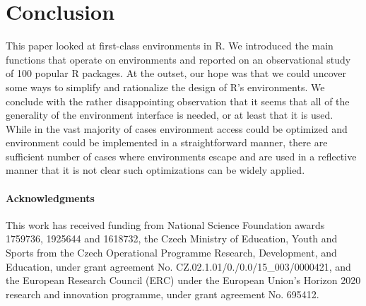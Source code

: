 \documentclass[10pt,sigplan,authorversion=true]{acmart}
\renewcommand{\c}[1]{\lstinline |#1|\xspace}
\begin{document}


\section{Conclusion}

This paper looked at first-class environments in R. We introduced the main
functions that operate on environments and reported on an observational study of
100 popular R packages. At the outset, our hope was that we could uncover some
ways to simplify and rationalize the design of R's environments. We conclude
with the rather disappointing observation that it seems that all of the
generality of the environment interface is needed, or at least that it is used.
While in the vast majority of cases environment access could be optimized and
environment could be implemented in a straightforward manner, there are
sufficient number of cases where environments escape and are used in a
reflective manner that it is not clear such optimizations can be widely applied.

\paragraph{Acknowledgments}
This work has received funding from National Science Foundation awards 1759736,
1925644 and 1618732, the Czech Ministry of Education, Youth and Sports from the
Czech Operational Programme Research, Development, and Education, under grant
agreement No. CZ.02.1.01/0./0.0/15\_003/0000421, and the European Research
Council (ERC) under the European Union’s Horizon 2020 research and innovation
programme, under grant agreement No. 695412.


\end{document}
